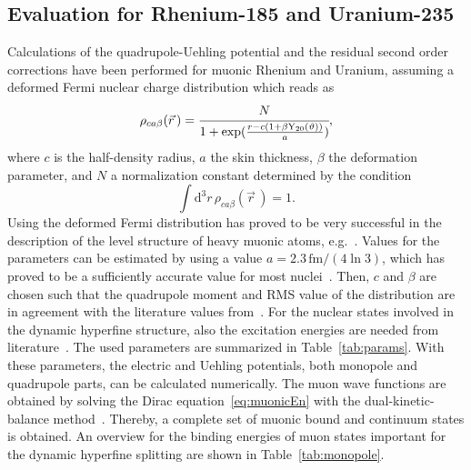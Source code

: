\subsection{Evaluation for Rhenium-185 and Uranium-235}
Calculations of the quadrupole-Uehling potential and the residual second order corrections have been performed for muonic Rhenium and Uranium, assuming a deformed Fermi nuclear charge distribution which reads as
\begin{equation}
\rho_{ca\beta}(\vec{r}\,)=\cfrac{N}{1+\exp (\frac{r-c(1+\beta \text{Y}_{20}(\vartheta))}{a})},
\label{eq:deffermi_2}
\end{equation}
where $c$ is the half-density radius, $a$ the skin thickness, $\beta$ the deformation parameter, and $N$ a normalization constant determined by the condition
\begin{equation}
\int \text{d}^3r\, \rho_{ca\beta}(\vec{r}\,)=1.
\end{equation}
Using the deformed Fermi distribution has proved to be very successful in the description of the level structure of heavy muonic atoms, e.g.~\cite{hitlin1970,tanaka1984,tanaka1984_2}.
Values for the parameters can be estimated by using a value ${a}{=}{2.3\,\text{fm}/(4\ln 3)}$, which has proved to be a sufficiently accurate value for most nuclei~\cite{Beier2000}. Then, $c$ and $\beta$ are chosen such that the quadrupole moment and RMS value of the distribution are in agreement with the literature values from~\cite{Angeli2013,Stone2005}. For the nuclear states involved in the dynamic hyperfine structure, also the excitation energies are needed from literature~\cite{ENSDF}. The used parameters are summarized in Table~\ref{tab:params}.
With these parameters, the electric and Uehling potentials, both monopole and quadrupole parts, can be calculated numerically. The muon wave functions are obtained by solving the Dirac equation~\eqref{eq:muonicEn} with the dual-kinetic-balance method~\cite{Shabaev2004}. Thereby, a complete set of muonic bound and continuum states is obtained. An overview for the binding energies of muon states important for the dynamic hyperfine splitting are shown in Table~\ref{tab:monopole}.

